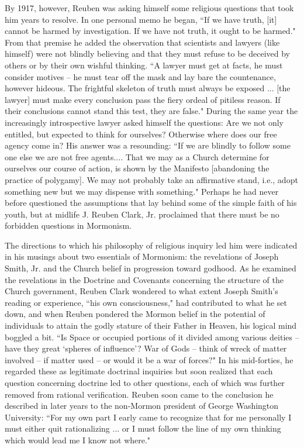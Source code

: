 \documentclass{article}
\begin{document}
By 1917, however, Reuben was asking himself some religious questions that took 
him years to resolve. In one personal memo he began, ``If we have truth, [it] 
cannot be harmed by investigation. If we have not truth, it ought to be harmed." 
From that premise he added the observation that scientists and lawyers 
(like himself) were not blindly believing and that they must refuse to be 
deceived by others or by their own wishful thinking. ``A lawyer must get at 
facts, he must consider motives -- he must tear off the mask and lay bare the 
countenance, however hideous. The frightful skeleton of truth must always be 
exposed ... [the lawyer] must make every conclusion pass the fiery ordeal of 
pitiless reason. If their conclusions cannot stand this test, they are false." 
During the same year the increasingly introspective lawyer asked himself the 
questions: Are we not only entitled, but expected to think for ourselves? 
Otherwise where does our free agency come in? His answer was a resounding: 
``If we are blindly to follow some one else we are not free agents.... 
That we may as a Church determine for ourselves our course of action, is 
shown by the Manifesto [abandoning the practice of polygamy]. We may not 
probably take an affirmative stand, i.e., adopt something new but we may 
dispense with something." Perhaps he had never before questioned the assumptions 
that lay behind some of the simple faith of his youth, but at midlife J. 
Reuben Clark, Jr. proclaimed that there must be no forbidden questions in 
Mormonism.

The directions to which his philosophy of religious inquiry led him were 
indicated in his musings about two essentials of Mormonism: the revelations of 
Joseph Smith, Jr. and the Church belief in progression toward godhood. As he 
examined the revelations in the Doctrine and Covenants concerning the structure 
of the Church government, Reuben Clark wondered to what extent Joseph Smith's 
reading or experience, ``his own consciousness," had contributed to what he set 
down, and when Reuben pondered the Mormon belief in the potential of individuals 
to attain the godly stature of their Father in Heaven, his logical mind boggled 
a bit. ``Is Space or occupied portions of it divided among various deities -- 
have they great `spheres of influence'? War of Gods -- think of wreck of matter 
involved -- if matter used -- or would it be a war of forces?" In his 
mid-forties, he regarded these as legitimate doctrinal inquiries but soon 
realized that each question concerning doctrine led to other questions, each 
of which was further removed from rational verification. Reuben soon came to the 
conclusion he described in later years to the non-Mormon president of George 
Washington University: ``For my own part I early came to recognize that for me 
personally I must either quit rationalizing ... or I must follow the line of 
my own thinking which would lead me I know not where."
\end{document}
